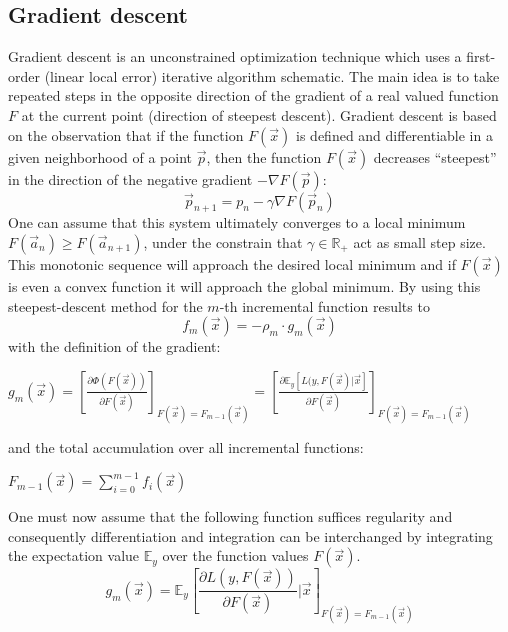 \documentclass[12pt, a4paper]{article}
\begin{document}
\subsection{Gradient descent}
Gradient descent is an unconstrained optimization technique which uses a first-order (linear local error) iterative algorithm schematic. The main idea is to take repeated steps in the opposite direction of the gradient of a real valued function $F$ at the current point (direction of steepest descent). Gradient descent is based on the observation that if the function $F(\vec{x})$ is defined and differentiable in a given neighborhood of a point $\vec{p}$, then the function $F(\vec{x})$ decreases ``steepest'' in the direction of the negative gradient $- \nabla F(\vec{p})$:
\begin{equation}
    \vec{p}_{n+1} = p_n - \gamma \nabla F(\vec{p}_n)
\end{equation}
One can assume that this system ultimately converges to a local minimum $F(\vec{a}_n) \geq F(\vec{a}_{n+1})$, under the constrain that $\gamma \in \mathbb{R}_{+}$ act as small step size. This monotonic sequence will approach the desired local minimum and if $F(\vec{x})$ is even a convex function it will approach the global minimum. By using this steepest-descent method for the $m$-th incremental function results to
\begin{equation}
    \label{eq: incr_function}
    f_m(\vec{x}) = - \rho_m \cdot g_m(\vec{x})
\end{equation}
with the definition of the gradient:
\begin{center}
    $g_m(\vec{x}) = [\frac{\partial \Phi(F(\vec{x}))}{\partial F(\vec{x})}]_{F(\vec{x}) = F_{m-1}(\vec{x})} = [\frac{\partial \mathbb{E}_y [L(y,F(\vec{x})|\vec{x}]}{\partial F(\vec{x})}]_{F(\vec{x}) = F_{m-1}(\vec{x})}$
\end{center}
and the total accumulation over all incremental functions:
\begin{center}
    $F_{m-1}(\vec{x}) = \sum_{i=0}^{m-1} f_i(\vec{x})$
\end{center}
One must now assume that the following function suffices regularity and consequently differentiation and integration can be interchanged by integrating the expectation value $\mathbb{E}_y$ over the function values $F(\vec{x})$.
\begin{equation}
    g_m(\vec{x}) = \mathbb{E}_y \left[\frac{\partial L(y, F(\vec{x}))}{\partial F(\vec{x})} | \vec{x}\right]_{F(\vec{x}) = F_{m-1}(\vec{x})}
\end{equation}
\end{document}
